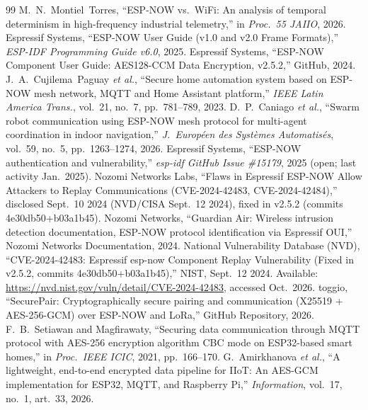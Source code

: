 \documentclass[conference]{IEEEtran}
\begin{document}
{\footnotesize\begin{thebibliography}{99}
\setlength{\itemsep}{0pt}\setlength{\parskip}{0pt}
 M.~N.~Montiel~Torres, ``ESP-NOW vs.\ WiFi: An analysis of temporal determinism in high-frequency industrial telemetry,'' in \textit{Proc.\ 55 JAIIO}, 2026.
 Espressif Systems, ``ESP-NOW User Guide (v1.0 and v2.0 Frame Formats),'' \textit{ESP-IDF Programming Guide v6.0}, 2025.
 Espressif Systems, ``ESP-NOW Component User Guide: AES128-CCM Data Encryption, v2.5.2,'' GitHub, 2024.
 J.~A.~Cujilema~Paguay \textit{et al.}, ``Secure home automation system based on ESP-NOW mesh network, MQTT and Home Assistant platform,'' \textit{IEEE Latin America Trans.}, vol.~21, no.~7, pp.~781--789, 2023.
 D.~P.~Caniago \textit{et al.}, ``Swarm robot communication using ESP-NOW mesh protocol for multi-agent coordination in indoor navigation,'' \textit{J.\ Europ{\'e}en des Syst{\`e}mes Automatis{\'e}s}, vol.~59, no.~5, pp.~1263--1274, 2026.
 Espressif Systems, ``ESP-NOW authentication and vulnerability,'' \textit{esp-idf GitHub Issue \#15179}, 2025 (open; last activity Jan.\ 2025).
 Nozomi Networks Labs, ``Flaws in Espressif ESP-NOW Allow Attackers to Replay Communications (CVE-2024-42483, CVE-2024-42484),'' disclosed Sept.\ 10 2024 (NVD/CISA Sept.\ 12 2024), fixed in v2.5.2 (commits 4e30db50+b03a1b45).
 Nozomi Networks, ``Guardian Air: Wireless intrusion detection documentation, ESP-NOW protocol identification via Espressif OUI,'' Nozomi Networks Documentation, 2024.
 National Vulnerability Database (NVD), ``CVE-2024-42483: Espressif esp-now Component Replay Vulnerability (Fixed in v2.5.2, commits 4e30db50+b03a1b45),'' NIST, Sept.\ 12 2024. Available: \url{https://nvd.nist.gov/vuln/detail/CVE-2024-42483}, accessed Oct.\ 2026.
 toggio, ``SecurePair: Cryptographically secure pairing and communication (X25519 + AES-256-GCM) over ESP-NOW and LoRa,'' GitHub Repository, 2026.
 F.~B.~Setiawan and Magfirawaty, ``Securing data communication through MQTT protocol with AES-256 encryption algorithm CBC mode on ESP32-based smart homes,'' in \textit{Proc.\ IEEE ICIC}, 2021, pp.~166--170.
 G.~Amirkhanova \textit{et al.}, ``A lightweight, end-to-end encrypted data pipeline for IIoT: An AES-GCM implementation for ESP32, MQTT, and Raspberry Pi,'' \textit{Information}, vol.~17, no.~1, art.~33, 2026.

\end{thebibliography}}
\end{document}
